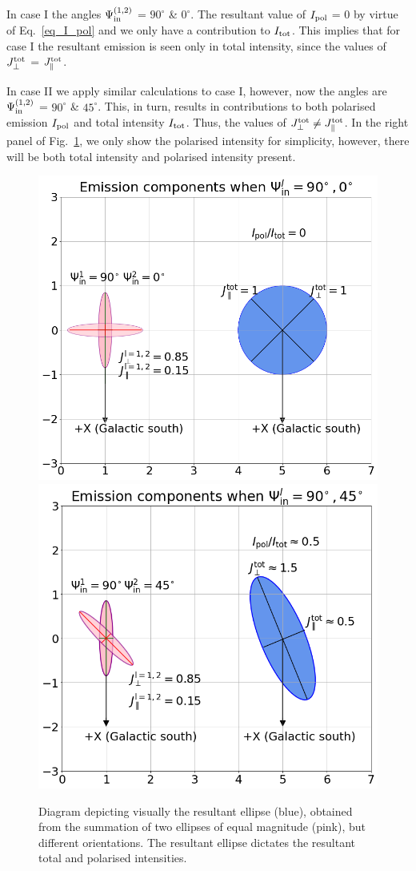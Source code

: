 \documentclass[usenatbib]{mnras}
\begin{document}
In case I the angles $\Psi_{\rm in}^{(1,2)}$ = $90^{\circ}$ \& $0^{\circ}$. The resultant value of $I_{\rm pol}$ = 0 by virtue of Eq.~\ref{eq_I_pol} and we only have a contribution to $I_{\rm tot}$. This implies that for case I the resultant emission is seen only in total intensity, since the values of $J_{\perp}^{\rm tot}$ = $J_{\parallel}^{\rm tot}$. 

In case II we apply similar calculations to case I, however, now the angles are $\Psi_{\rm in}^{(1,2)}$ = $90^{\circ}$ \& $45^{\circ}$. This, in turn, results in contributions to both polarised emission $I_{\rm pol}$ and total intensity $I_{\rm tot}$. Thus, the values of $J_{\perp}^{\rm tot} \neq J_{\parallel}^{\rm tot}$. In the right panel of Fig.~\ref{fig_tot_pol_intensity}, we only show the polarised intensity for simplicity, however, there will be both total intensity and polarised intensity present.

\begin{figure}
\centering
\includegraphics[width = 0.49\linewidth]{Images/Total_intensity_Ellipses_circles_emissions.png}
\label{fig_tot_intensity}
\includegraphics[width = 0.49\linewidth]{Images/Pol_intensity_Ellipses_circles_emissions.png}
\label{fig_pol_intensity}
\caption{Diagram depicting visually the resultant ellipse (blue), obtained from the summation of two ellipses of equal magnitude (pink), but different orientations. The resultant ellipse dictates the resultant total and polarised intensities.}
\label{fig_tot_pol_intensity}
\end{figure}
\end{document}
